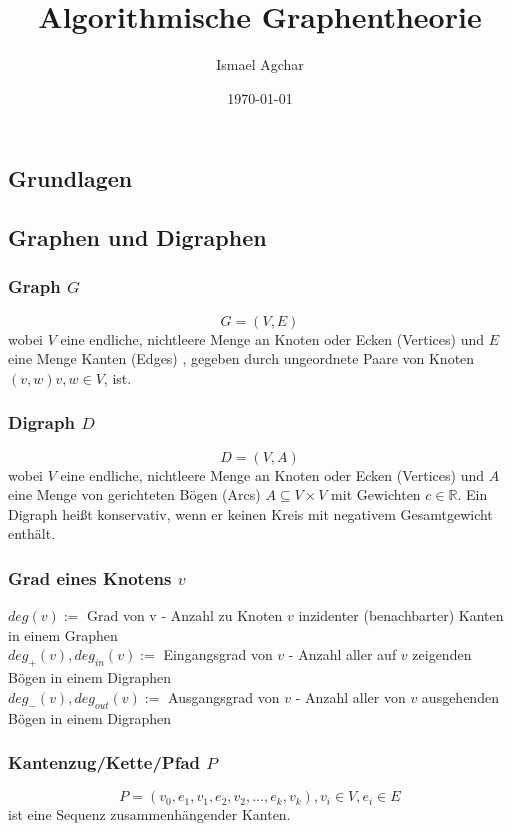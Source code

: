 \documentclass[10pt,a4paper,landscape]{article}
\title{ Algorithmische Graphentheorie }
\author{ Ismael Agchar }
\date{\today}
\begin{document}
\tableofcontents
\newpage

\begin{multicols*}{2}
\normalsize
\section{ Grundlagen }
    \subsection{ Graphen und Digraphen }
    
    \subsubsection*{ Graph $G$ }  
    \[ G = (V,E) \]
    wobei $V$ eine endliche, nichtleere Menge an Knoten oder Ecken (Vertices) und $E$ eine Menge Kanten (Edges) 
    , gegeben durch ungeordnete Paare von Knoten $(v,w) v, w \in V$, ist.
    
    \subsubsection*{ Digraph $D$ }
    \[ D = (V,A)\]
    wobei $V$ eine endliche, nichtleere Menge an Knoten oder Ecken (Vertices) und $A$ eine Menge von gerichteten 
    Bögen (Arcs) $A \subseteq V \times V$ mit Gewichten $c \in \mathbb{R}$. Ein Digraph heißt konservativ, wenn er 
    keinen Kreis mit negativem Gesamtgewicht enthält.

    \subsubsection*{ Grad eines Knotens $v$ }
    $deg(v) :=$ Grad von v - Anzahl zu Knoten $v$ inzidenter (benachbarter) Kanten in einem Graphen \\
    $deg_{+}(v), deg_{in}(v) :=$ Eingangsgrad von $v$ - Anzahl aller auf $v$ zeigenden Bögen in einem Digraphen \\
    $deg_{-}(v), deg_{out}(v) :=$ Ausgangsgrad von $v$ - Anzahl aller von $v$ ausgehenden Bögen in einem Digraphen 

    \subsubsection*{ Kantenzug/Kette/Pfad $P$ }
    \[ P = (v_0, e_1, v_1, e_2, v_2, \dots, e_k, v_k), v_i \in V, e_i \in E \]
    ist eine Sequenz zusammenhängender Kanten. 

\end{multicols*}
\end{document}
